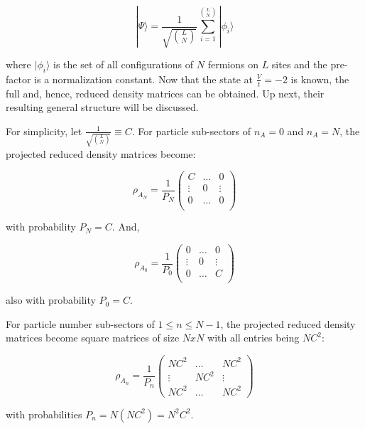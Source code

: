 \begin{equation} 
|\Psi \rangle = \frac{1}{\sqrt{{L}\choose{N}}} \sum_{i=1}^{{L}\choose{N}} | \phi_{i} \rangle
\end{equation}

where $|\phi_{i}\rangle$ is the set of all configurations of $N$ fermions on $L$ sites and the pre-factor is a normalization constant. Now that the state at $\frac{V}{t}=-2$ is known, the full and, hence, reduced density matrices can be obtained. Up next, their resulting general structure will be discussed.

For simplicity, let $\frac{1}{\sqrt{{L}\choose{N}}} \equiv C$. For particle sub-sectors of $n_A = 0$ and $n_A = N$, the projected reduced density matrices become:

\begin{equation}
\rho_{A_N} = \frac{1}{P_{N}} \begin{pmatrix}
C & \dots & 0 \\ 
\vdots & 0 & \vdots \\
0 & \dots & 0 \\
\end{pmatrix}
\end{equation}

with probability $P_{N} = C$. And, 

\begin{equation}
\rho_{A_0} = \frac{1}{P_{0}} \begin{pmatrix}
0 & \dots & 0 \\ 
\vdots & 0 & \vdots \\
0 & \dots & C \\
\end{pmatrix}
\end{equation}

also with probability $P_{0} = C$.

For particle number sub-sectors of $1 \leq n \leq N-1$, the projected reduced density matrices become square matrices of size $NxN$ with all entries being $NC^2$:

\begin{equation}
\rho_{A_n} = \frac{1}{P_{n}} \begin{pmatrix}
NC^2 & \dots & NC^2 \\ 
\vdots & NC^2 & \vdots \\
NC^2 & \dots & NC^2
\end{pmatrix}
\end{equation}

with probabilities $P_{n}=N(NC^2)=N^2C^2$.

